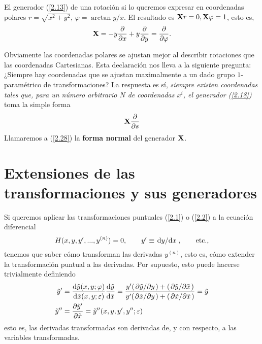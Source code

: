 \begin{ejemplo}
    El generador (\ref{2.13}) de una rotación si lo queremos expresar en coordenadas polares $r=\sqrt{x^2+y^2}$, $\varphi=\arctan y/x$. El resultado es $\vb{X}r=0, \vb{X}\varphi=1$, esto es,
    \begin{equation}\label{2.27}
        \vb{X}=-y\pdv{x}+y\pdv{y}=\pdv{\varphi}.
    \end{equation}
\end{ejemplo}

Obviamente las coordenadas polares se ajustan mejor al describir rotaciones que las coordenadas Cartesianas. Esta declaración nos lleva a la siguiente pregunta: ¿Siempre hay coordenadas que se ajustan maximalmente a un dado grupo $1$-paramétrico de transformaciones? La respuesta es sí, \textit{siempre existen coordenadas tales que, para un número arbitrario $N$ de coordenadas $x^{i}$, el generador (\ref{2.18})} toma la simple forma
\begin{equation}\label{2.28}
    \vb{X}\pdv{s}
\end{equation}
Llamaremos a (\ref{2.28}) la \textbf{forma normal} del generador $\vb{X}$.

\section{Extensiones de las transformaciones y sus generadores}
Si queremos aplicar las transformaciones puntuales (\ref{2.1}) o (\ref{2.2}) a la ecuación diferencial 
\begin{equation}\label{2.30}
    H(x,y,y',...,y^{(n)})=0,\qquad y'\equiv \dv*{y}{x},\qquad \text{etc.,}
\end{equation}
tenemos que saber cómo transforman las derivadas $y^{(n)}$, esto es, cómo extender la transformación puntual a las derivadas. Por supuesto, esto puede hacerse trivialmente definiendo
\begin{align}\label{2.31}
    \Tilde{y}'&=\frac{\dd \Tilde{y}(x,y;\varphi)}{\dd\Tilde{x}(x,y;\varepsilon)}\dv{\Tilde{y}}{\Tilde{x}}=\frac{y'(\pdv*{\Tilde{y}}{y})+(\pdv*{\Tilde{y}}{\Tilde{x}})}{y'(\pdv*{\Tilde{x}}{y})+(\pdv*{\Tilde{x}}{\Tilde{x}})}=\Tilde{y}\\
    \Tilde{y}''&=\pdv{\Tilde{y}'}{\Tilde{x}}=\Tilde{y}''(x,y,y',y'';\varepsilon)
\end{align}
esto es, las derivadas transformadas son derivadas de, y con respecto, a las variables transformadas.

